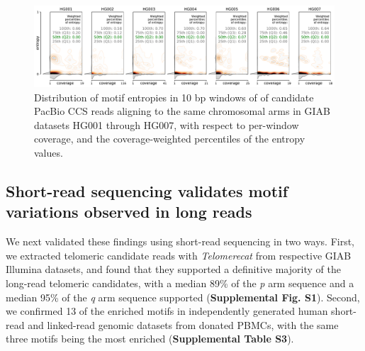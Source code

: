 \documentclass{article}
\begin{document}
        \begin{figure}[h!] \centering
        \includegraphics[height=.75\textheight,width=\textwidth,keepaspectratio]{../figures/Figure_3.pdf}
        \caption{
            \small Distribution of motif entropies in 10 bp windows of of candidate PacBio CCS reads aligning to the same chromosomal arms
            in GIAB datasets HG001 through HG007,
            with respect to per-window coverage,
            and the coverage-weighted percentiles of the entropy values.
        }
        \label{fig:entropy}
        \end{figure}

\subsection*{Short-read sequencing validates motif variations observed in long reads}
    We next validated these findings using short-read sequencing in two ways.
    First, we extracted telomeric candidate reads with \textit{Telomerecat} \parencite{telomerecat}
        from respective GIAB Illumina datasets,
        and found that they supported a definitive majority of the long-read telomeric candidates, with
            a median 89\% of the \textit{p} arm sequence
            and a median 95\% of the \textit{q} arm sequence supported
            (\textbf{Supplemental Fig. S1}).
    Second, we confirmed 13 of the enriched motifs in independently generated human short-read and linked-read genomic datasets
        from donated PBMCs, with the same three motifs being the most enriched (\textbf{Supplemental Table S3}).
\end{document}
